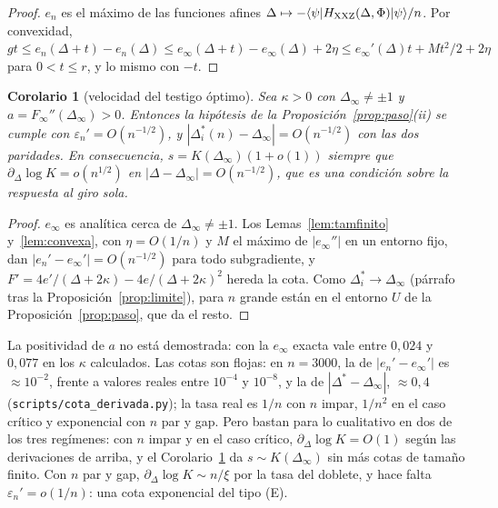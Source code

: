 \documentclass[11pt,a4paper]{article}
\newtheorem{corolario}[teorema]{Corolario}
\theoremstyle{remark}
\begin{document}
\begin{proof}
$e_n$ es el máximo de las funciones afines $\Delta\mapsto-\langle\psi|H_{\rm XXZ}(\Delta,\Phi)|\psi\rangle/n$.
Por convexidad, $gt\le e_n(\Delta+t)-e_n(\Delta)\le e_\infty(\Delta+t)-e_\infty(\Delta)+2\eta\le
e_\infty'(\Delta)t+Mt^2/2+2\eta$ para $0<t\le r$, y lo mismo con $-t$.
\end{proof}

\begin{corolario}[velocidad del testigo óptimo]\label{cor:velocidad}
Sea $\kappa>0$ con $\Delta_\infty\ne\pm1$ y $a=F_\infty''(\Delta_\infty)>0$. Entonces la hipótesis de la
Proposición~\ref{prop:paso}(ii) se cumple con $\varepsilon_n'=O(n^{-1/2})$, y
$|\Delta^\ast_i(n)-\Delta_\infty|=O(n^{-1/2})$ con las dos paridades. En consecuencia,
$s=K(\Delta_\infty)(1+o(1))$ siempre que $\partial_\Delta\log K=o(n^{1/2})$ en
$|\Delta-\Delta_\infty|=O(n^{-1/2})$, que es una condición sobre la respuesta al giro sola.
\end{corolario}

\begin{proof}
$e_\infty$ es analítica cerca de $\Delta_\infty\ne\pm1$. Los Lemas~\ref{lem:tamfinito}
y~\ref{lem:convexa}, con $\eta=O(1/n)$ y $M$ el máximo de $|e_\infty''|$ en un entorno fijo, dan
$|e_n'-e_\infty'|=O(n^{-1/2})$ para todo subgradiente, y
$F'=4e'/(\Delta+2\kappa)-4e/(\Delta+2\kappa)^2$ hereda la cota. Como $\Delta^\ast_i\to\Delta_\infty$
(párrafo tras la Proposición~\ref{prop:limite}), para $n$ grande están en el entorno $U$ de la
Proposición~\ref{prop:paso}, que da el resto.
\end{proof}

La positividad de $a$ no está demostrada: con la $e_\infty$ exacta vale entre $0{,}024$ y $0{,}077$ en
los $\kappa$ calculados. Las cotas son flojas: en $n=3000$, la de $|e_n'-e_\infty'|$ es
$\approx10^{-2}$, frente a valores reales entre $10^{-4}$ y $10^{-8}$, y la de $|\Delta^\ast-\Delta_\infty|$,
$\approx0{,}4$ (\texttt{scripts/cota\_derivada.py}); la tasa real es $1/n$ con $n$ impar, $1/n^2$
en el caso crítico y exponencial con $n$ par y gap. Pero bastan para lo cualitativo en dos de los tres
regímenes: con $n$ impar y en el caso crítico, $\partial_\Delta\log K=O(1)$ según las derivaciones
de arriba, y el Corolario~\ref{cor:velocidad} da $s\sim K(\Delta_\infty)$ sin más cotas de tamaño
finito. Con $n$ par y gap, $\partial_\Delta\log K\sim n/\xi$ por la tasa del doblete, y hace falta
$\varepsilon_n'=o(1/n)$: una cota exponencial del tipo (E).
\end{document}
